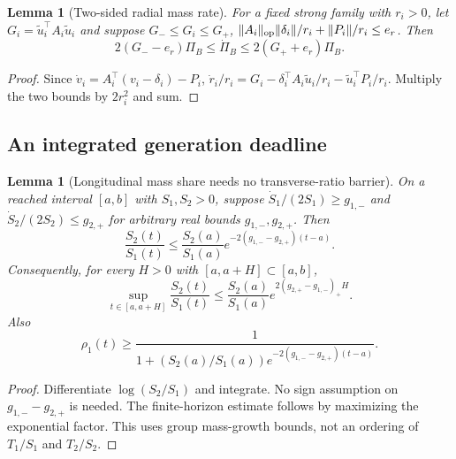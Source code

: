 \documentclass{article} %
\theoremstyle{plain}
\newtheorem{lemma}[theorem]{Lemma}
\theoremstyle{definition}
\theoremstyle{remark}
\begin{document}
\begin{lemma}[Two-sided radial mass rate]\label{sbgap:mass-rate}
For a fixed strong family with $r_i>0$, let
$G_i=\widetilde u_i^\top A_i\widetilde u_i$ and suppose
$G_-\le G_i\le G_+$,
$\|A_i\|_{\rm op}\|\delta_i\|/r_i+\|P_i\|/r_i\le e_r$.
Then
\[
 2(G_--e_r)\Pi_B\le\dot\Pi_B\le2(G_++e_r)\Pi_B.
\]
\end{lemma}
\begin{proof}
Since $\dot v_i=A_i^\top(v_i-\delta_i)-P_i$,
$\dot r_i/r_i=G_i-\delta_i^\top A_i\widetilde u_i/r_i
-\widetilde u_i^\top P_i/r_i$.
Multiply the two bounds by $2r_i^2$ and sum.
\end{proof}

\subsection{An integrated generation deadline}

\begin{lemma}[Longitudinal mass share needs no transverse-ratio barrier]
\label{sbgap:mass-share}
On a reached interval $[a,b]$ with $S_1,S_2>0$, suppose
$\dot S_1/(2S_1)\ge g_{1,-}$ and
$\dot S_2/(2S_2)\le g_{2,+}$ for arbitrary real bounds
$g_{1,-},g_{2,+}$.  Then
\begin{equation}\label{sbgap:mass-share-eq}
 \boxed{
 \frac{S_2(t)}{S_1(t)}
 \le\frac{S_2(a)}{S_1(a)}
       e^{-2(g_{1,-}-g_{2,+})(t-a)}.
 }
\end{equation}
Consequently, for every $H>0$ with $[a,a+H]\subset[a,b]$,
\begin{equation}\label{sbgap:mass-share-horizon}
 \boxed{
 \sup_{t\in[a,a+H]}\frac{S_2(t)}{S_1(t)}
 \le\frac{S_2(a)}{S_1(a)}
 e^{2(g_{2,+}-g_{1,-})_+H}.
 }
\end{equation}
Also
\[
 \rho_1(t)\ge
 \frac1{1+(S_2(a)/S_1(a))e^{-2(g_{1,-}-g_{2,+})(t-a)}}.
\]
\end{lemma}
\begin{proof}
Differentiate $\log(S_2/S_1)$ and integrate.  No sign assumption on
$g_{1,-}-g_{2,+}$ is needed.  The finite-horizon estimate follows by
maximizing the exponential factor.  This uses group mass-growth bounds, not
an ordering of $T_1/S_1$ and $T_2/S_2$.
\end{proof}
\end{document}

